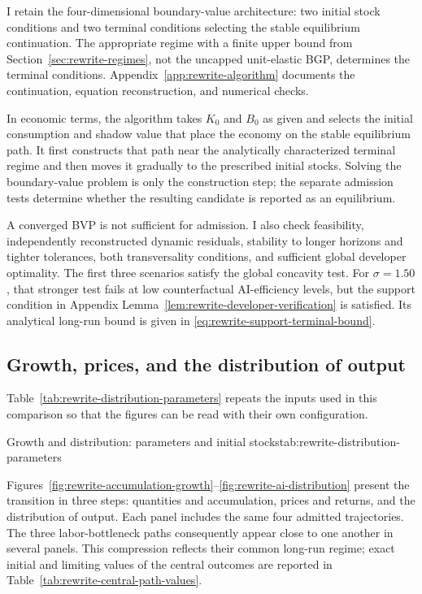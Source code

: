 I retain the four-dimensional boundary-value architecture: two initial stock
conditions and two terminal conditions selecting the stable equilibrium
continuation. The appropriate regime with a finite upper bound from
Section~\ref{sec:rewrite-regimes}, not the uncapped unit-elastic BGP, determines
the terminal conditions. Appendix~\ref{app:rewrite-algorithm} documents the
continuation, equation reconstruction, and numerical checks.

In economic terms, the algorithm takes $K_0$ and $B_0$ as given and selects
the initial consumption and shadow value that place the economy on the stable
equilibrium path. It first constructs that path near the analytically
characterized terminal regime and then moves it gradually to the prescribed
initial stocks. Solving the boundary-value problem is only the construction
step; the separate admission tests determine whether the resulting candidate
is reported as an equilibrium.

A converged BVP is not sufficient for admission. I also check feasibility,
independently reconstructed dynamic residuals, stability to longer horizons
and tighter tolerances, both transversality conditions, and sufficient global
developer optimality. The first three scenarios satisfy the global concavity
test. For $\sigma=1.50$, that stronger test fails at low counterfactual
AI-efficiency levels, but the support condition in Appendix
Lemma~\ref{lem:rewrite-developer-verification} is satisfied. Its analytical
long-run bound is given in \eqref{eq:rewrite-support-terminal-bound}.

\subsection{Growth, prices, and the distribution of output}
\label{subsec:rewrite-distribution}

Table~\ref{tab:rewrite-distribution-parameters} repeats the inputs used in
this comparison so that the figures can be read with their own configuration.
\begin{rewriteParameterTable}{Growth and distribution: parameters and initial stocks}{tab:rewrite-distribution-parameters}
\rewriteMainParameterRows
\end{rewriteParameterTable}

Figures~\ref{fig:rewrite-accumulation-growth}--\ref{fig:rewrite-ai-distribution}
present the transition in three steps: quantities and accumulation, prices and
returns, and the distribution of output. Each panel includes the same four
admitted trajectories. The three labor-bottleneck paths consequently appear
close to one another in several panels. This compression reflects their common
long-run regime; exact initial and limiting values of the central outcomes are
reported in Table~\ref{tab:rewrite-central-path-values}.

